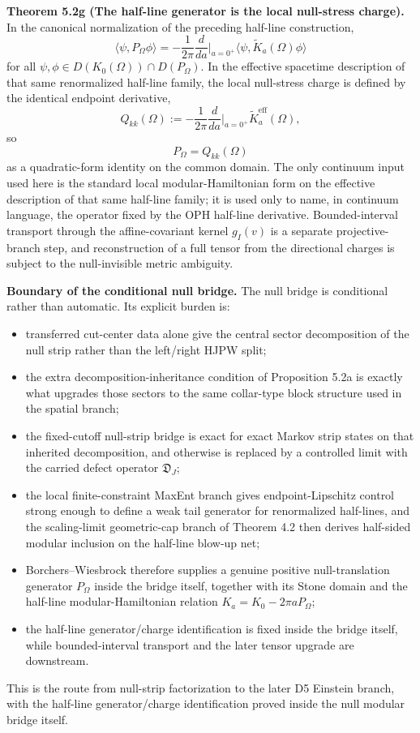 \textbf{Theorem 5.2g (The half-line generator is the local null-stress charge).} In the canonical normalization of the preceding half-line construction,
\[
\langle\psi,P_\Omega\phi\rangle
=
-\frac{1}{2\pi}\frac{d}{da}\Big|_{a=0^+}
\langle\psi,\widetilde K_a(\Omega)\phi\rangle
\]
for all \(\psi,\phi\in D(K_0(\Omega))\cap D(P_\Omega)\). In the effective spacetime description of that same renormalized half-line family, the local null-stress charge is defined by the identical endpoint derivative,
\[
Q_{kk}(\Omega)
:=
-\frac{1}{2\pi}\frac{d}{da}\Big|_{a=0^+}\widetilde K^{\mathrm{eff}}_a(\Omega),
\]
so
\[
P_\Omega = Q_{kk}(\Omega)
\]
as a quadratic-form identity on the common domain. The only continuum input used here is the standard local modular-Hamiltonian form on the effective description of that same half-line family; it is used only to name, in continuum language, the operator fixed by the OPH half-line derivative. Bounded-interval transport through the affine-covariant kernel \(g_I(v)\) is a separate projective-branch step, and reconstruction of a full tensor from the directional charges is subject to the null-invisible metric ambiguity.

\textbf{Boundary of the conditional null bridge.} The null bridge is conditional rather than automatic. Its explicit burden is:
\begin{itemize}
\tightlist
\item
  transferred cut-center data alone give the central sector decomposition of the null strip rather than the left/right HJPW split;
\item
  the extra decomposition-inheritance condition of Proposition 5.2a is exactly what upgrades those sectors to the same collar-type block structure used in the spatial branch;
\item
  the fixed-cutoff null-strip bridge is exact for exact Markov strip states on that inherited decomposition, and otherwise is replaced by a controlled limit with the carried defect operator \(\mathfrak D_J\);
\item
  the local finite-constraint MaxEnt branch gives endpoint-Lipschitz control strong enough to define a weak tail generator for renormalized half-lines, and the scaling-limit geometric-cap branch of Theorem 4.2 then derives half-sided modular inclusion on the half-line blow-up net;
\item
  Borchers--Wiesbrock therefore supplies a genuine positive null-translation generator \(P_\Omega\) inside the bridge itself, together with its Stone domain and the half-line modular-Hamiltonian relation \(K_a=K_0-2\pi aP_\Omega\);
\item
  the half-line generator/charge identification is fixed inside the bridge itself, while bounded-interval transport and the later tensor upgrade are downstream.
\end{itemize}
This is the route from null-strip factorization to the later D5 Einstein branch, with the half-line generator/charge identification proved inside the null modular bridge itself.
